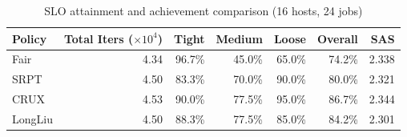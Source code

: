 \begin{table}[t]
\centering
\caption{SLO attainment and achievement comparison (16 hosts, 24 jobs)}
\label{tab:slo_16host}
\begin{tabular}{l|r|r|r|r|r|r}
\hline
Policy & Total Iters ($\times 10^4$) & Tight & Medium & Loose & Overall & SAS \\
\hline
Fair & 4.34 & 96.7\% & 45.0\% & 65.0\% & 74.2\% & 2.338 \\
SRPT & 4.50 & 83.3\% & 70.0\% & 90.0\% & 80.0\% & 2.321 \\
CRUX & 4.53 & 90.0\% & 77.5\% & 95.0\% & 86.7\% & 2.344 \\
LongLiu & 4.50 & 88.3\% & 77.5\% & 85.0\% & 84.2\% & 2.301 \\
\hline
\end{tabular}
\end{table}
